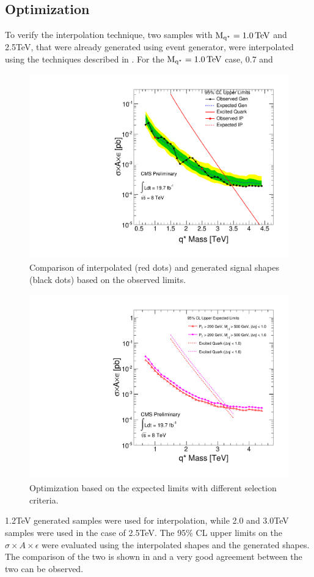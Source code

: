 \subsection{Optimization}\label{Se:optimization}
To verify the interpolation technique, two \qstar samples with $\mathrm{M_{q^\star}}=1.0\mathrm{\,TeV}$ and 2.5\unit{TeV}, that were already generated using \pythia 
event generator, were interpolated using the techniques described in \sectn{\ref{Se:InterpolationTech}}. For the $\mathrm{M_{q^\star}}=1.0\mathrm{\,TeV}$ case, 0.7 and 
\begin{figure}[h!]
\centering
\includegraphics[width=12cm,height=8cm]{ch5/plots/InterpolationPlots/GenVsIP_1TeV_2p5TeV_LowPt170_LowM500GeV_dEta1p6_ObseExp_Limits_qstar_full_v2.pdf}
 \caption{Comparison of interpolated (red dots) and generated signal shapes (black dots) based on the observed limits.}
 \label{fig:TestInterpolation}
\end{figure}
\begin{figure}[h!]
\centering
\includegraphics[width=12cm,height=8cm]{ch5/plots/Limit/Pt200GeV_ReReco_Optimizaion_ForDeltaEta_ExpectedLimits_qstar_v2.pdf}
\caption{Optimization based on the expected limits with different \deta selection criteria.}
\label{fig:OptimizeDEtaA}
\end{figure}
1.2\unit{TeV} generated \qstar samples were used for interpolation, while 2.0 and 3.0\unit{TeV} samples were used in the case of 2.5\unit{TeV}. 
The 95\% CL upper limits on the $\sigma\times{A}\times\epsilon$ were evaluated using the interpolated shapes and the generated shapes. 
The comparison of the two is shown in \fig{\ref{fig:TestInterpolation}} and a very good agreement between the two can be observed.


